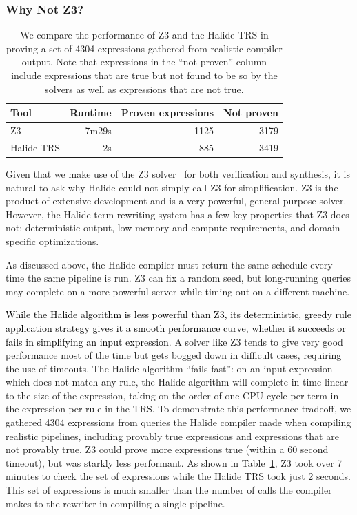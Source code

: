 \documentclass[acmsmall]{acmart}\settopmatter{}
\newcommand{\modified}[1]{\textcolor{black}{{#1}}}
\begin{document}
\subsubsection{Why Not Z3?}
\begin{table}
\caption{We compare the performance of Z3 and the Halide TRS in proving a set of 4304 expressions gathered from realistic compiler output. Note that expressions in the ``not proven'' column include expressions that are true but not found to be so by the solvers as well as expressions that are not true. }
\begin{tabular}{l|r|r|r}
Tool & Runtime & Proven expressions & Not proven \\
\hline
Z3 & 7m29s & 1125 & 3179 \\
Halide TRS & 2s & 885 & 3419 
\end{tabular}
\label{tab:simplifiervsz3}
\end{table}


Given that we make use of the Z3 solver~\cite{de2008z3} for both verification and synthesis, it is natural to ask why Halide could not simply call Z3 for simplification. Z3 is the product of extensive development and is a very powerful, general-purpose solver. However, the Halide term rewriting system has a few key properties that Z3 does not: deterministic output, low memory and compute requirements, and domain-specific optimizations.

As discussed above, the Halide compiler must return the same schedule every time the same pipeline is run. Z3 can fix a random seed, but long-running queries may complete on a more powerful server while timing out on a different machine.

\modified{While the Halide algorithm is less powerful than Z3, its deterministic, greedy rule application strategy
gives it a smooth performance curve, whether it succeeds or fails in simplifying an input expression. }
A solver like Z3 tends to give very good performance most of the time but gets bogged down in difficult cases, requiring the use of timeouts. The Halide algorithm ``fails fast'': on an input expression which does not match any rule,  the Halide algorithm will complete in time linear to the size of the expression, taking on the order of one CPU cycle per term in the expression per rule in the TRS. To demonstrate this performance tradeoff, we gathered 4304 expressions from queries the Halide compiler made when compiling realistic pipelines, including provably true expressions and expressions that are not provably true. Z3 could prove more expressions true (within a 60 second timeout), but was starkly less performant. As shown in Table~\ref{tab:simplifiervsz3}, Z3 took over 7 minutes to check the set of expressions while the Halide TRS took just 2 seconds. This set of expressions is much smaller than the number of calls the compiler makes to the rewriter in compiling a single pipeline.
\end{document}
